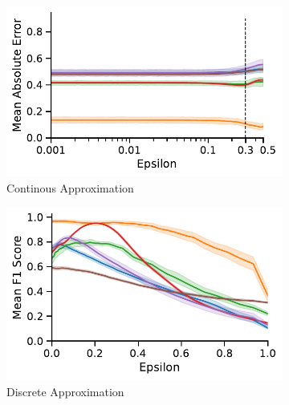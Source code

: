 \begin{figure}[!htb]
	\centering
	\begin{subfigure}[t]{0.39\textwidth}
		\centering
		\includegraphics[width=\textwidth]{Figures/global_error_1_b.pdf}
		\caption{Continous Approximation}
		\label{fig:approx_error}
	\end{subfigure}
	\hfill
	\begin{subfigure}[t]{0.39\textwidth}
		\centering
		\includegraphics[width=\textwidth]{Figures/global_error_2_b.pdf}
		\caption{Discrete Approximation}
		\label{fig:approx_error_f1}
	\end{subfigure}
	\hfill
	\begin{subfigure}[t]{0.2\textwidth}
		\centering
		\raisebox{22pt}{
}
\end{subfigure}
\end{figure}
